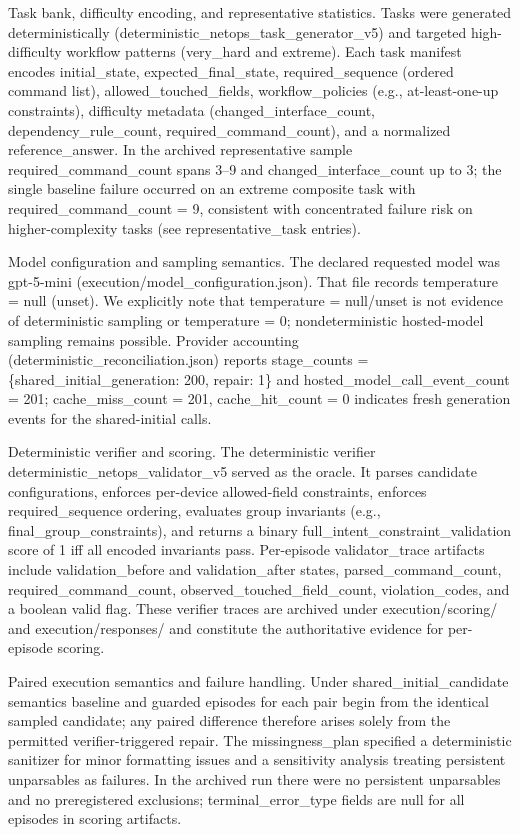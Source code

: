 \documentclass[conference]{IEEEtran}
\begin{document}
Task bank, difficulty encoding, and representative statistics. Tasks were generated deterministically (deterministic\_netops\_task\_generator\_v5) and targeted high-difficulty workflow patterns (very\_hard and extreme). Each task manifest encodes initial\_state, expected\_final\_state, required\_sequence (ordered command list), allowed\_touched\_fields, workflow\_policies (e.g., at-least-one-up constraints), difficulty metadata (changed\_interface\_count, dependency\_rule\_count, required\_command\_count), and a normalized reference\_answer. In the archived representative sample required\_command\_count spans 3--9 and changed\_interface\_count up to 3; the single baseline failure occurred on an extreme composite task with required\_command\_count = 9, consistent with concentrated failure risk on higher-complexity tasks (see representative\_task entries).

Model configuration and sampling semantics. The declared requested model was gpt-5-mini (execution/model\_configuration.json). That file records temperature = null (unset). We explicitly note that temperature = null/unset is not evidence of deterministic sampling or temperature = 0; nondeterministic hosted-model sampling remains possible. Provider accounting (deterministic\_reconciliation.json) reports stage\_counts = \{shared\_initial\_generation: 200, repair: 1\} and hosted\_model\_call\_event\_count = 201; cache\_miss\_count = 201, cache\_hit\_count = 0 indicates fresh generation events for the shared-initial calls.

Deterministic verifier and scoring. The deterministic verifier deterministic\_netops\_validator\_v5 served as the oracle. It parses candidate configurations, enforces per-device allowed-field constraints, enforces required\_sequence ordering, evaluates group invariants (e.g., final\_group\_constraints), and returns a binary full\_intent\_constraint\_validation score of 1 iff all encoded invariants pass. Per-episode validator\_trace artifacts include validation\_before and validation\_after states, parsed\_command\_count, required\_command\_count, observed\_touched\_field\_count, violation\_codes, and a boolean valid flag. These verifier traces are archived under execution/scoring/ and execution/responses/ and constitute the authoritative evidence for per-episode scoring.

Paired execution semantics and failure handling. Under shared\_initial\_candidate semantics baseline and guarded episodes for each pair begin from the identical sampled candidate; any paired difference therefore arises solely from the permitted verifier-triggered repair. The missingness\_plan specified a deterministic sanitizer for minor formatting issues and a sensitivity analysis treating persistent unparsables as failures. In the archived run there were no persistent unparsables and no preregistered exclusions; terminal\_error\_type fields are null for all episodes in scoring artifacts.
\end{document}
